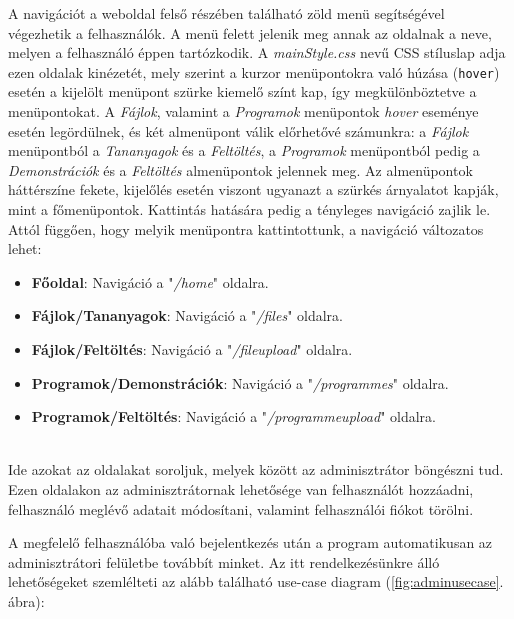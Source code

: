 A navigációt a weboldal felső részében található zöld menü segítségével végezhetik a felhasználók. A menü felett jelenik meg annak az oldalnak a neve, melyen a felhasználó éppen tartózkodik. A \textit{mainStyle.css} nevű CSS stíluslap adja ezen oldalak kinézetét, mely szerint a kurzor menüpontokra való húzása (\texttt{hover}) esetén a kijelölt menüpont szürke kiemelő színt kap, így megkülönböztetve a menüpontokat. A \textit{Fájlok}, valamint a \textit{Programok} menüpontok \textit{hover} eseménye esetén legördülnek, és két almenüpont válik előrhetővé számunkra: a \textit{Fájlok} menüpontból a \textit{Tananyagok} és a \textit{Feltöltés}, a \textit{Programok} menüpontból pedig a \textit{Demonstrációk} és a \textit{Feltöltés} almenüpontok jelennek meg. Az almenüpontok háttérszíne fekete, kijelőlés esetén viszont ugyanazt a szürkés árnyalatot kapják, mint a főmenüpontok. Kattintás hatására pedig a tényleges navigáció zajlik le. Attól függően, hogy melyik menüpontra kattintottunk, a navigáció változatos lehet:

\begin{itemize}
\item{\textbf{Főoldal}: Navigáció a "\textit{/home}" oldalra.}
\item{\textbf{Fájlok/Tananyagok}: Navigáció a "\textit{/files}" oldalra.}
\item{\textbf{Fájlok/Feltöltés}: Navigáció a "\textit{/fileupload}" oldalra.}
\item{\textbf{Programok/Demonstrációk}: Navigáció a "\textit{/programmes}" oldalra.}
\item{\textbf{Programok/Feltöltés}: Navigáció a "\textit{/programmeupload}" oldalra.}
\end{itemize}

\\

Ide azokat az oldalakat soroljuk, melyek között az adminisztrátor böngészni tud. Ezen oldalakon az adminisztrátornak lehetősége van felhasználót hozzáadni, felhasználó meglévő adatait módosítani, valamint felhasználói fiókot törölni.

A megfelelő felhasználóba való bejelentkezés után a program automatikusan az adminisztrátori felületbe továbbít minket. Az itt rendelkezésünkre álló lehetőségeket szemlélteti az alább található use-case diagram (\ref{fig:adminusecase}. ábra):

